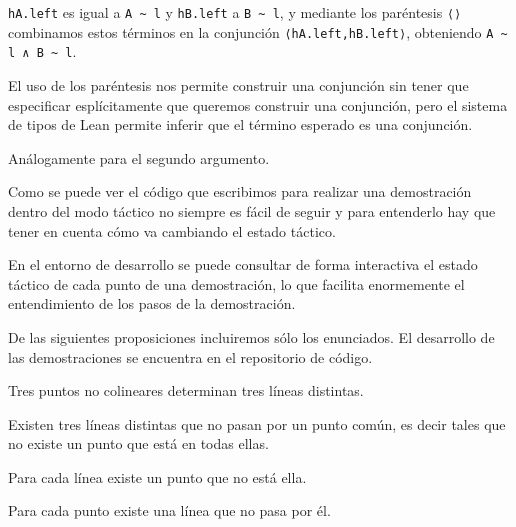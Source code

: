 \begin{enumerate}[label=L.\arabic*, topsep=0mm]
	      \lstinline{hA.left} es igual a \lstinline{A ~ l} y \lstinline{hB.left} a
	      \lstinline{B ~ l}, y mediante los paréntesis \lstinline{⟨⟩} combinamos
	      estos términos en la conjunción \lstinline{⟨hA.left,hB.left⟩}, obteniendo
	      \lstinline{A ~ l ∧ B ~ l}.

	      El uso de los paréntesis nos permite construir una conjunción sin tener
	      que especificar esplícitamente que queremos construir una conjunción, pero
	      el sistema de tipos de Lean permite inferir que el término esperado es una
	      conjunción.

	      Análogamente para el segundo argumento.
\end{enumerate}

Como se puede ver el código que escribimos para realizar una demostración dentro
del modo táctico no siempre es fácil de seguir y para entenderlo hay que tener
en cuenta cómo va cambiando el estado táctico.

En el entorno de desarrollo se puede consultar de forma interactiva el estado
táctico de cada punto de una demostración, lo que facilita enormemente el
entendimiento de los pasos de la demostración.

De las siguientes proposiciones incluiremos sólo los enunciados. El desarrollo
de las demostraciones se encuentra en el repositorio de código.

\begin{prop} Tres puntos no colineares determinan tres líneas distintas.
\end{prop}



\begin{prop}
	Existen tres líneas distintas que no pasan por un punto común, es decir
	tales que no existe un punto que está en todas ellas.
\end{prop}


\begin{prop}
	Para cada línea existe un punto que no está ella.
\end{prop}


\begin{prop}
	Para cada punto existe una línea que no pasa por él.
\end{prop}


